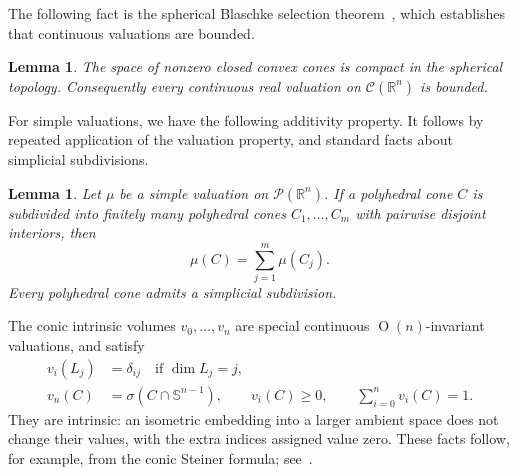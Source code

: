 \documentclass[11pt]{article}
\newcommand{\R}{\mathbb{R}}
\newcommand{\PP}{\mathcal P}
\newcommand{\On}[1]{\operatorname{O}(#1)}
\newcommand{\CC}{\mathcal{C}}
\newcommand{\sphere}[1]{\mathbb{S}^{#1}}
\newtheorem{lemma}[theorem]{Lemma}
\begin{document}
The following fact is the spherical Blaschke selection
theorem~\cite[Theorem~3.1.3]{Sch22:Convex-Cones}, which establishes that 
continuous valuations are bounded.

\begin{lemma}\label{lem:cone-compactness}
The space of nonzero closed convex cones is compact in the spherical
topology. Consequently every continuous real valuation on
$\CC(\R^n)$ is bounded.
\end{lemma}

For simple valuations, we have the following additivity property.
It follows by repeated application of the valuation property, and 
standard facts about simplicial subdivisions.

\begin{lemma}\label{lem:subdivision-additivity}
Let $\mu$ be a simple valuation on $\PP(\R^n)$. If a polyhedral cone
$C$ is subdivided into finitely many polyhedral cones $C_1,\ldots,C_m$
with pairwise disjoint interiors, then
\begin{equation}\label{eq:inclusion-exclusion}
 \mu(C)=\sum_{j=1}^m\mu(C_j).
\end{equation}
Every polyhedral cone admits a simplicial subdivision.
\end{lemma}



The conic intrinsic volumes $v_0,\ldots,v_n$ are special continuous
$\On n$-invariant valuations, and satisfy
\begin{align}
 v_i(L_j)&=\delta_{ij}\quad \text{if } \dim L_j=j,\label{eq:iv-subspaces}\\
 v_n(C)&=\sigma(C\cap\sphere{n-1}),\qquad
 v_i(C)\ge0,\qquad \sum_{i=0}^n v_i(C)=1.\label{eq:iv-volume}
\end{align}
They are intrinsic: an isometric embedding into a larger ambient space
does not change their values, with the extra indices assigned value
zero. These facts follow, for example, from the conic Steiner formula;
see~\cite{AmelunxenLotz:Intrinsic-Volumes-Cones,Sch22:Convex-Cones}.
\end{document}
